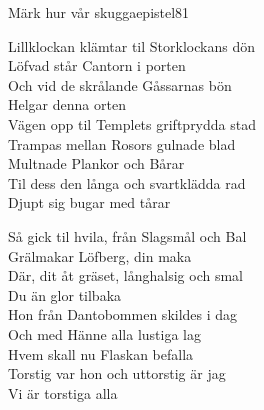 \begin{song}{Märk hur vår skugga}{epistel81}
\begin{vers}
Lillklockan klämtar til Storklockans dön\\
Löfvad står Cantorn i porten\\
Och vid de skrålande Gåssarnas bön\\
Helgar denna orten\\
Vägen opp til Templets griftprydda stad\\
Trampas mellan Rosors gulnade blad\\
Multnade Plankor och Bårar\\
Til dess den långa och svartklädda rad\\
Djupt sig bugar med tårar\\
\end{vers}
\begin{vers}
Så gick til hvila, från Slagsmål och Bal\\
Grälmakar Löfberg, din maka\\
Där, dit åt gräset, långhalsig och smal\\
Du än glor tilbaka\\
Hon från Dantobommen skildes i dag\\
Och med Hänne alla lustiga lag\\
Hvem skall nu Flaskan befalla\\
Torstig var hon och uttorstig är jag\\
Vi är torstiga alla\\
\end{vers}
\end{song}
